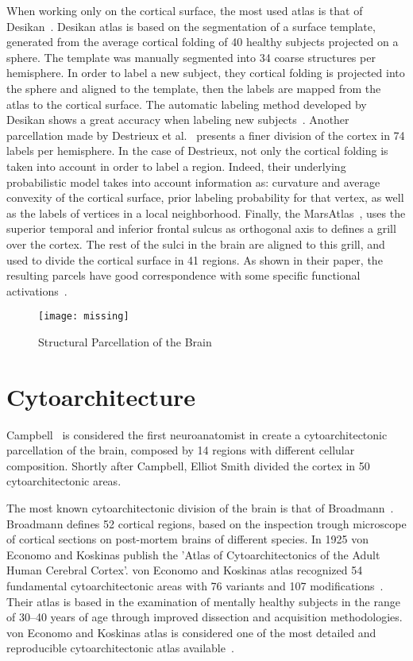 When working only on the cortical surface, the most used atlas is that of
Desikan~\cite{Desikan2006}. Desikan atlas is based on the segmentation of a surface
template, generated from the average cortical folding of 40 healthy subjects
projected on a sphere. The template was manually segmented into 34 coarse 
structures per hemisphere. In order to label a new subject, they cortical 
folding is projected into the sphere and aligned to the template, then 
the labels are mapped from the atlas to the cortical surface. The automatic
labeling method developed by Desikan shows a great accuracy when labeling
new subjects~\cite{Desikan2006}. Another parcellation made by 
Destrieux et al.~\cite{Destrieux2010} presents a finer division of the cortex in
74 labels per hemisphere. In the case of Destrieux, not only the cortical
folding is taken into account in order to label a region. Indeed, their
underlying probabilistic model takes into account information as: curvature
and average convexity of the cortical surface, prior labeling probability for
that vertex, as well as the labels of vertices in a local neighborhood.
Finally, the MarsAtlas~\cite{Auzias2016}, uses the superior temporal
and inferior frontal sulcus as orthogonal axis to defines a grill over the cortex.
The rest of the sulci in the brain are aligned to this grill, and used to divide
the cortical surface in 41 regions. As shown in their paper, the resulting parcels
have good correspondence with some specific functional activations~\cite{Auzias2016}.

\begin{figure*}[t]
    \texttt{[image: missing]}
    \caption{Structural Parcellation of the Brain}
    \label{fig:brain_function}
\end{figure*}

\section{Cytoarchitecture}
\label{sec:cytoarchitecture}

Campbell~\cite{Campbell1905} is considered the first neuroanatomist in create
a cytoarchitectonic parcellation of the brain, composed by 14 regions with
different cellular composition. Shortly after Campbell, Elliot Smith\cite{Smith1907}
divided the cortex in 50 cytoarchitectonic areas.

The most known cytoarchitectonic division of the brain is that of
Broadmann~\cite{Brodmann1909}. Broadmann defines 52 cortical regions, based
on the inspection trough microscope of cortical sections on post-mortem
brains of different species. In 1925 von Economo and Koskinas publish
the 'Atlas of Cytoarchitectonics of the Adult Human Cerebral Cortex'\cite{VonEconomo1925}.
von Economo and Koskinas atlas recognized 54 fundamental cytoarchitectonic areas with
76 variants and 107 modifications~\cite{Triarhou2007}. Their atlas is based in the
examination of mentally healthy subjects in the range of 30–40 years of age
through improved dissection and acquisition methodologies. von Economo and 
Koskinas atlas is considered one of the most detailed and reproducible cytoarchitectonic
atlas available~\cite{Peden1947}.

